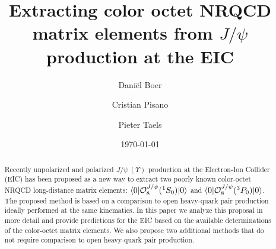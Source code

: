 \documentclass[prd,aps,preprintnumbers,nofootinbib,superscriptaddress]{revtex4}
\begin{document}
\title{Extracting color octet NRQCD matrix elements from $J/\psi$ production at the EIC}

\author{Dani\"el Boer}

\author{Cristian Pisano}

\author{Pieter Taels}

\begin{abstract}
Recently unpolarized and polarized $J/\psi \,(\Upsilon)$ production at the Electron-Ion Collider (EIC) has been proposed as a new way to extract two poorly known color-octet NRQCD long-distance matrix elements: $\langle0\vert{\cal O}_{8}^{J/\psi}(^{1}S_{0})\vert0\rangle$ and $\langle0\vert{\cal O}_{8}^{J/\psi}(^{3}P_{0})\vert0\rangle$. The proposed method is based on a comparison to open heavy-quark pair production ideally performed at the same kinematics. In this paper we analyze this proposal in more detail and provide predictions for the EIC based on the available determinations of the color-octet matrix elements. We also propose two additional methods that do not require comparison to open heavy-quark pair production.
\end{abstract}

\date{\today}

\maketitle
\end{document}
